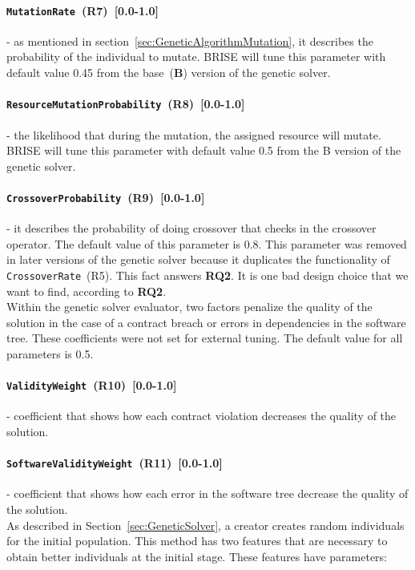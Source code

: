 \paragraph{\texttt{MutationRate}~(R7)~[0.0-1.0]} - as mentioned in section~\ref{sec:GeneticAlgorithmMutation}, it describes the probability of the individual to mutate. BRISE will tune this parameter with default value 0.45 from the base~(\textbf{B}) version of the genetic solver.
\paragraph{\texttt{ResourceMutationProbability}~(R8)~[0.0-1.0]} - the likelihood that during the mutation, the assigned resource will mutate. BRISE will tune this parameter with default value 0.5 from the B version of the genetic solver.
\paragraph{\texttt{CrossoverProbability}~(R9)~[0.0-1.0]} - it describes the probability of doing crossover that checks in the crossover operator. The default value of this parameter is 0.8. This parameter was removed in later versions of the genetic solver because it duplicates the functionality of \texttt{CrossoverRate}~(R5). This fact answers \textbf{RQ2}. It is one bad design choice that we want to find, according to \textbf{RQ2}.\\ 


Within the genetic solver evaluator, two factors penalize the quality of the solution in the case of a contract breach or errors in dependencies in the software tree. These coefficients were not set for external tuning. The default value for all parameters is 0.5.
\paragraph{\texttt{ValidityWeight}~(R10)~[0.0-1.0]} - coefficient that shows how each contract violation decreases the quality of the solution.
\paragraph{\texttt{SoftwareValidityWeight}~(R11)~[0.0-1.0]} - coefficient that shows how each error in the software tree decrease the quality of the solution.\\

As described in Section~\ref{sec:GeneticSolver}, a creator creates random individuals for the initial population.
This method has two features that are necessary to obtain better individuals at the initial stage. These features have parameters:
